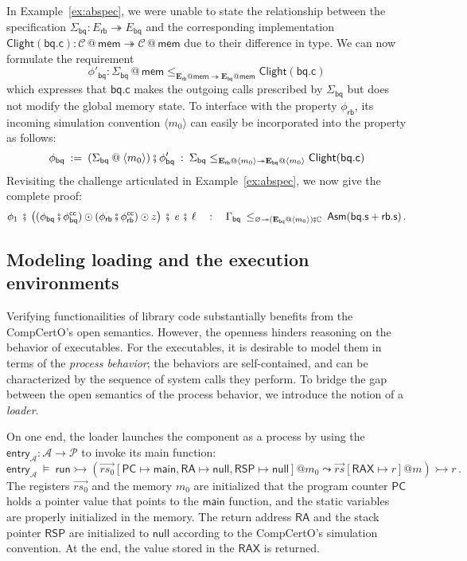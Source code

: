\documentclass[acmsmall,screen,review,anonymous,nonacm]{acmart}
\newcommand{\kw}[1]{\ensuremath{ \mathsf{#1} }}
\newcommand{\vcomp}{\fatsemi}
\begin{document}
In Example~\ref{ex:abspec},
we were unable to state the relationship
between the specification
$\Sigma_\kw{bq} : E_\kw{rb} \twoheadrightarrow E_\kw{bq}$
and the corresponding implementation
$\kw{Clight}(\kw{bq.c}) : \mathcal{C} \mathbin@ \kw{mem}
 \twoheadrightarrow \mathcal{C} \mathbin@ \kw{mem}$
due to their difference in type.
We can now formulate the requirement
\[
\phi'_\kw{bq} : \Sigma_\kw{bq} \mathbin@ \kw{mem}
\le_{\mathbf{E}_\kw{rb}@\kw{mem} \twoheadrightarrow \mathbf{E}_\kw{bq}@\kw{mem}}
\kw{Clight}(\kw{bq.c})
\]%
which expresses that $\kw{bq.c}$
makes the outgoing calls prescribed by $\Sigma_\kw{bq}$
but does not modify the global memory state.
To interface with
the property $\phi_\kw{rb}$,
its incoming simulation convention
$\langle m_0 \rangle$
can easily be incorporated into the property
as follows:
\[
  \phi_\kw{bq} \: := \:
    (\Sigma_\kw{bq} \mathbin@ \langle m_0 \rangle)
    \vcomp
    \phi'_\kw{bq}
  \: : \:
  \Sigma_\kw{bq}
    \le_{\mathbf{E}_\kw{rb} \mathbin@ \langle m_0 \rangle
         \twoheadrightarrow
         \mathbf{E}_\kw{bq} \mathbin@ \langle m_0 \rangle}
    \kw{Clight}(\kw{bq.c})
\]
Revisiting the challenge articulated in Example~\ref{ex:abspec},
we now give the complete proof:
\[
  \phi_1
  \:\vcomp\:
  \big(
  (\phi_\kw{bq} \vcomp \phi^\kw{cc}_\kw{bq}) \odot
  (\phi_\kw{rb} \vcomp \phi^\kw{cc}_\kw{rb}) \odot z
  \big)
  \:\vcomp\:
  \textit{e}
  \:\vcomp\:
  \ell
  \quad : \quad
  \Gamma_\kw{bq}
  \:
  \le_{\varnothing \twoheadrightarrow
       (\mathbf{E}_\kw{bq} \mathbin@ \langle m_0 \rangle) \vcomp \mathbb{C}}
  \:
  \kw{Asm}(\kw{bq.s} + \kw{rb.s})
  \,.
\]

\subsection{Modeling loading and the execution environments}
\label{sec:application:loader}  %

Verifying functionailities
of library code substantially benefits from
the CompCertO's open semantics.
However,
the openness hinders reasoning
on the behavior of executables.
For the executables,
it is desirable to
model them
in terms of the \textit{process behavior};
the behaviors are self-contained,
and can be characterized
by the sequence of system calls
they perform.
To bridge the gap
between the open semantics of
the process behavior,
we introduce the notion of a \textit{loader}.

On one end,
the loader launches
the component as a process
by using the
$\kw{entry}_\mathcal{A} : \mathcal{A} \rightarrow \mathcal{P}$
to invoke its main function:
\[
  \kw{entry}_\mathcal{A} \:\vDash\:
  \kw{run} \rightarrowtail
  (\vec{rs_0}[\kw{PC}\mapsto \kw{main},
  \kw{RA} \mapsto \kw{null},
  \kw{RSP}\mapsto \kw{null}]@m_0 \leadsto
  \vec{rs}[\kw{RAX} \mapsto r]@m) \rightarrowtail r \,.
\]
The registers $\vec{rs_0}$ and the memory $m_0$ are
initialized that
the program counter $\kw{PC}$ holds a pointer value
that points to
the $\kw{main}$ function,
and the static variables
are properly initialized in the memory.
The return address $\kw{RA}$
and the stack pointer $\kw{RSP}$
are initialized to $\kw{null}$
according to the CompCertO's simulation convention.
At the end,
the value stored in the $\kw{RAX}$ is returned.
\end{document}
